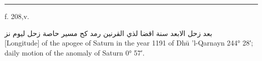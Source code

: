 \documentclass[11pt]{article}
\newcommand{\AbjadZero}{{\NallinoSigns\symbol{"E000}}}
\begin{document}
\clearpage
\noindent{}
\par\vspace{-1mm}\noindent\rule{\textwidth}{.4pt}\par\vspace{1mm}
\begin{center}{\small f. 208,v.}\end{center}\vspace{-3mm}
\begin{center}\textarabic{بعد زحل الابعد سنة اقضا لذي القرنين رمد كح مسير حاصة زحل ليوم \AbjadZero{} نز}\\[1mm]{\small [Longitude] of the apogee of Saturn in the year 1191 of Dhū ’l-Qarnayn 244° 28′; daily motion of the anomaly of Saturn 0° 57′.}\end{center}\vspace{-2mm}
\end{document}
